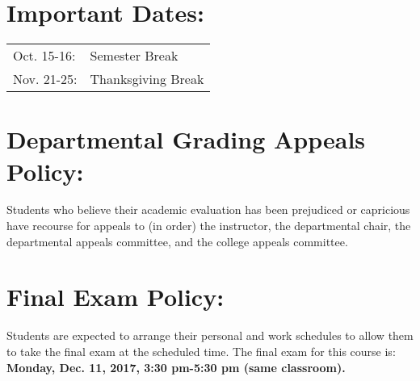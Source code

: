\documentclass[margin]{res}
\theoremstyle{plain}
\theoremstyle{definition}
\theoremstyle{remark}
\begin{document}
\begin{resume}
\section{Important Dates:}
\begin{tabular}{ll}
Oct. 15-16: & Semester Break\\
Nov. 21-25: & Thanksgiving Break\\
  \end{tabular}

\section{Departmental Grading Appeals Policy:} Students who believe their academic evaluation has been prejudiced or capricious have recourse for appeals to (in order) the instructor, the departmental chair, the departmental appeals committee, and the college appeals committee.  

\section{Final Exam Policy:} Students are expected to arrange their personal and
work schedules to allow them to take the final exam at the scheduled time.  The
final exam for this course is:\\ 
\textbf{Monday, Dec. 11, 2017,  3:30 pm-5:30 pm (same classroom).}   



\end{resume}
\end{document}

